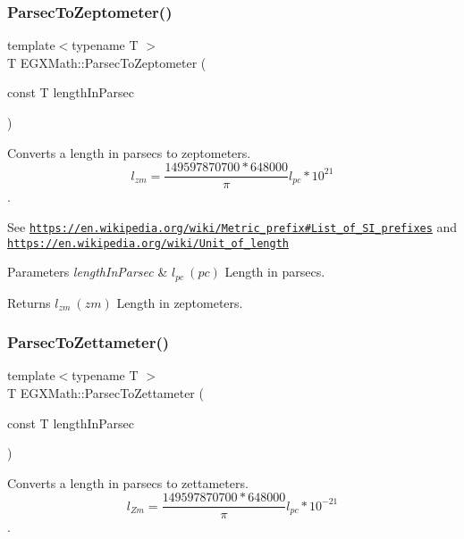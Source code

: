 \subsubsection{\texorpdfstring{Parsec\+To\+Zeptometer()}{ParsecToZeptometer()}}
{\footnotesize\ttfamily template$<$typename T $>$ \\
T E\+G\+X\+Math\+::\+Parsec\+To\+Zeptometer (\begin{DoxyParamCaption}\item[{const T}]{length\+In\+Parsec }\end{DoxyParamCaption})}



Converts a length in parsecs to zeptometers. \[ l_{zm}=\frac{149597870700 * 648000}{\pi}l_{pc} * 10^{21} \]. 

See \href{https://en.wikipedia.org/wiki/Metric_prefix#List_of_SI_prefixes}{\tt https\+://en.\+wikipedia.\+org/wiki/\+Metric\+\_\+prefix\#\+List\+\_\+of\+\_\+\+S\+I\+\_\+prefixes} and \href{https://en.wikipedia.org/wiki/Unit_of_length}{\tt https\+://en.\+wikipedia.\+org/wiki/\+Unit\+\_\+of\+\_\+length} 
\begin{DoxyParams}{Parameters}
{\em length\+In\+Parsec} & $ l_{pc}\ (pc)$ Length in parsecs. \\
\hline
\end{DoxyParams}
\begin{DoxyReturn}{Returns}
$ l_{zm}\ (zm)$ Length in zeptometers. 
\end{DoxyReturn}
\mbox{\label{group___e_g_x_math-_conversions-_length_conversions-_astronomical-_parsec-_s_i_gad7d13308de04663badf7e5ea4021b43f}} 
\subsubsection{\texorpdfstring{Parsec\+To\+Zettameter()}{ParsecToZettameter()}}
{\footnotesize\ttfamily template$<$typename T $>$ \\
T E\+G\+X\+Math\+::\+Parsec\+To\+Zettameter (\begin{DoxyParamCaption}\item[{const T}]{length\+In\+Parsec }\end{DoxyParamCaption})}



Converts a length in parsecs to zettameters. \[ l_{Zm}=\frac{149597870700 * 648000}{\pi}l_{pc} * 10^{-21} \]. 

